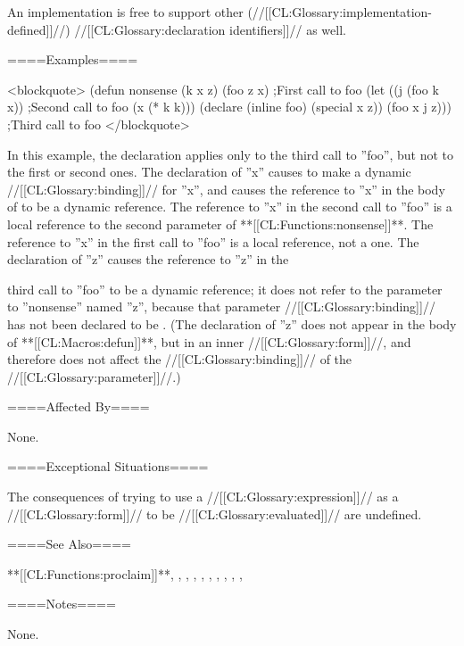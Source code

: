 
An implementation is free to support other (//[[CL:Glossary:implementation-defined]]//) //[[CL:Glossary:declaration identifiers]]// as well.

====Examples====

<blockquote> (defun nonsense (k x z) (foo z x) ;First call to foo (let ((j (foo k x)) ;Second call to foo (x (* k k))) (declare (inline foo) (special x z)) (foo x j z))) ;Third call to foo </blockquote>

In this example, the  declaration applies only to the third call to ''foo'', but not to the first or second ones. The  declaration of ''x'' causes  to make a dynamic //[[CL:Glossary:binding]]// for ''x'', and causes the reference to ''x'' in the body of  to be a dynamic reference. The reference to ''x'' in the second call to ''foo'' is a local reference to the second parameter of **[[CL:Functions:nonsense]]**. The reference to ''x'' in the first call to ''foo'' is a local reference, not a  one. The  declaration of ''z'' causes the reference to ''z'' in the

third call to ''foo'' to be a dynamic reference; it does not refer to the parameter to ''nonsense'' named ''z'', because that parameter //[[CL:Glossary:binding]]// has not been declared to be . (The  declaration of ''z'' does not appear in the body of **[[CL:Macros:defun]]**, but in an inner //[[CL:Glossary:form]]//, and therefore does not affect the //[[CL:Glossary:binding]]// of the //[[CL:Glossary:parameter]]//.)

====Affected By====

None.

====Exceptional Situations====

The consequences of trying to use a  //[[CL:Glossary:expression]]// as a //[[CL:Glossary:form]]// to be //[[CL:Glossary:evaluated]]// are undefined.


====See Also====

**[[CL:Functions:proclaim]]**, \secref\TypeSpecifiers, , , , , , , , , 

====Notes====

None.

       
